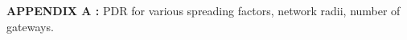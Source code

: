 \singlespacing

\textbf{APPENDIX A :} PDR for various spreading factors, network radii, number of gateways.
